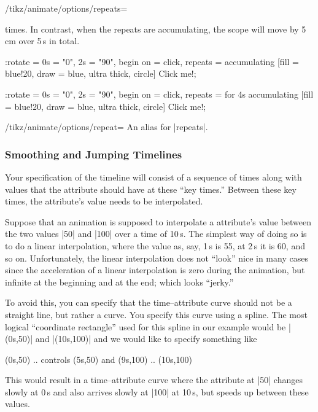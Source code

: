 \begin{key}{/tikz/animate/options/repeats=}
\begin{itemize}
    times. In contrast, when the repeats are accumulating, the scope
    will move by 5\,cm over 5\,s in total.    
\begin{codeexample}[animation list={1,2,3,4,5}]
\tikz \node :rotate = { 0s = "0", 2s = "90", begin on = click,
                        repeats = accumulating }
    [fill = blue!20, draw = blue, ultra thick, circle] {Click me!}; 
\end{codeexample}
\begin{codeexample}[animation list={1,2,3,4,5}]
\tikz \node :rotate = { 0s = "0", 2s = "90", begin on = click,
                        repeats = for 4s accumulating }
    [fill = blue!20, draw = blue, ultra thick, circle] {Click me!}; 
\end{codeexample}
  \end{itemize}
\end{key}

\begin{key}{/tikz/animate/options/repeat=}
  An alias for |repeats|.
\end{key}


\subsubsection{Smoothing and Jumping Timelines}

\label{section-anim-smooth}

Your specification of the timeline will consist of a sequence of
times along with values that the attribute should have at these ``key
times.'' Between these key times, the attribute's value needs to be
interpolated. 
  
Suppose that an animation is supposed to interpolate a attribute's
value between the two values |50| and |100| over a time of
10\,s. The simplest way of doing so is to do a linear
interpolation, where the value as, say, 1\,s is 55, at 2\,s it is
60, and so on. Unfortunately, the linear interpolation does not
``look'' nice in many cases since the acceleration of a linear
interpolation is zero  during the animation, but infinite at the
beginning and at the end; which looks ``jerky.''

To avoid this, you can specify that the time--attribute curve should 
not be a straight line, but rather a curve. You specify this curve
using a spline. The most logical ``coordinate rectangle'' used for
this spline in our example would be |(0s,50)| and |(10s,100)| and we
would like to specify something like
\begin{codeexample}
  (0s,50) .. controls (5s,50) and (9s,100) .. (10s,100)
\end{codeexample}
This would result in a time--attribute curve where
the attribute at |50| changes slowly at 0\,s and also arrives slowly
at |100| at 10\,s, but speeds up between these values.

